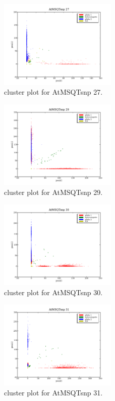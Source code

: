 \begin{figure}[H]
\includegraphics[width=0.5\textwidth]{figures/cluster_plot_AtMSQTsnp_27.png}
\caption{cluster plot for AtMSQTsnp 27.} \label{flAtMSQTsnp27}
\end{figure}

\begin{figure}[H]
\includegraphics[width=0.5\textwidth]{figures/cluster_plot_AtMSQTsnp_29.png}
\caption{cluster plot for AtMSQTsnp 29.} \label{flAtMSQTsnp29}
\end{figure}

\begin{figure}[H]
\includegraphics[width=0.5\textwidth]{figures/cluster_plot_AtMSQTsnp_30.png}
\caption{cluster plot for AtMSQTsnp 30.} \label{flAtMSQTsnp30}
\end{figure}

\begin{figure}[H]
\includegraphics[width=0.5\textwidth]{figures/cluster_plot_AtMSQTsnp_31.png}
\caption{cluster plot for AtMSQTsnp 31.} \label{flAtMSQTsnp31}
\end{figure}

